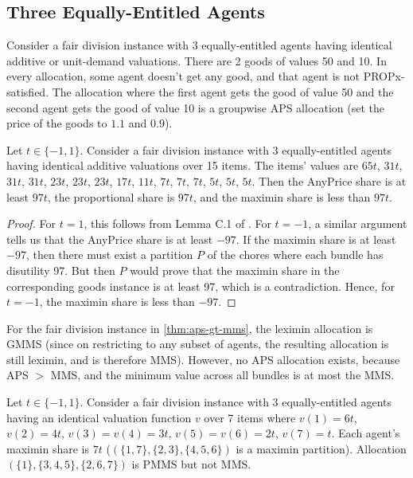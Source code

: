 \subsection{Three Equally-Entitled Agents}
\label{sec:cex-extra:3-eqEnt}

\begin{example}
\label{cex:gaps-not-propx}
Consider a fair division instance with 3 equally-entitled agents
having identical additive or unit-demand valuations. There are 2 goods of values 50 and 10.
In every allocation, some agent doesn't get any good, and that agent is not PROPx-satisfied.
The allocation where the first agent gets the good of value 50
and the second agent gets the good of value 10 is a groupwise APS allocation
(set the price of the goods to $1.1$ and $0.9$).
\end{example}

\begin{lemma}
\label{thm:aps-gt-mms}
Let $t \in \{-1, 1\}$.
Consider a fair division instance with 3 equally-entitled agents
having identical additive valuations over 15 items. The items' values are
$65t$, $31t$, $31t$, $31t$, $23t$, $23t$, $23t$, $17t$, $11t$, $7t$, $7t$, $7t$, $5t$, $5t$, $5t$.
Then the AnyPrice share is at least $97t$, the proportional share is $97t$,
and the maximin share is less than $97t$.
\end{lemma}
\begin{proof}
For $t = 1$, this follows from Lemma C.1 of \cite{babaioff2023fair}.
For $t = -1$, a similar argument tells us that the AnyPrice share is at least $-97$.
If the maximin share is at least $-97$, then there must exist a partition $P$ of the chores
where each bundle has disutility 97. But then $P$ would prove that the maximin share
in the corresponding goods instance is at least 97, which is a contradiction.
Hence, for $t = -1$, the maximin share is less than $-97$.
\end{proof}

\begin{example}
\label{cex:gmms-not-aps}
For the fair division instance in \cref{thm:aps-gt-mms},
the leximin allocation is GMMS (since on restricting to any subset of agents,
the resulting allocation is still leximin, and is therefore MMS).
However, no APS allocation exists, because APS $>$ MMS,
and the minimum value across all bundles is at most the MMS.
\end{example}

\begin{example}
\label{cex:pmms-not-mms}
Let $t \in \{-1, 1\}$.
Consider a fair division instance with 3 equally-entitled agents
having an identical valuation function $v$ over 7 items where
$v(1) = 6t$, $v(2) = 4t$, $v(3) = v(4) = 3t$, $v(5) = v(6) = 2t$, $v(7) = t$.
Each agent's maximin share is $7t$ ($(\{1, 7\}, \{2, 3\}, \{4, 5, 6\})$ is a maximin partition).
Allocation $(\{1\}, \{3, 4, 5\}, \{2, 6, 7\})$ is PMMS but not MMS.
\end{example}

